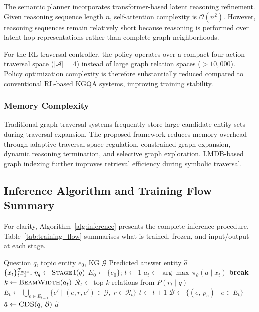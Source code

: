 \documentclass[10pt,conference]{IEEEtran}
\begin{document}
The semantic planner incorporates transformer-based latent reasoning refinement. Given reasoning sequence length $n$, self-attention complexity is $\mathcal{O}(n^2)$. However, reasoning sequences remain relatively short because reasoning is performed over latent hop representations rather than complete graph neighborhoods.

For the RL traversal controller, the policy operates over a compact four-action traversal space ($|\mathcal{A}|=4$) instead of large graph relation spaces ($>10,000$). Policy optimization complexity is therefore substantially reduced compared to conventional RL-based KGQA systems, improving training stability.

\subsubsection{Memory Complexity}

Traditional graph traversal systems frequently store large candidate entity sets during traversal expansion. The proposed framework reduces memory overhead through adaptive traversal-space regulation, constrained graph expansion, dynamic reasoning termination, and selective graph exploration. LMDB-based graph indexing further improves retrieval efficiency during symbolic traversal.


\subsection{Inference Algorithm and Training Flow Summary}

For clarity, Algorithm~\ref{alg:inference} presents the complete inference procedure. Table~\ref{tab:training_flow} summarises what is trained, frozen, and input/output at each stage.

\begin{algorithm}[t]
\caption{Framework Inference (Standard RL / STRL)}
\label{alg:inference}
\begin{algorithmic}[1]
\Require Question $q$, topic entity $e_0$, KG $\mathcal{G}$
\Ensure Predicted answer entity $\hat{a}$
\State $\{x_t\}_{t=1}^{T_{\max}},\, \eta_q \gets \textsc{Stage\,I}(q)$ 
\State $E_0 \gets \{e_0\}$;\; $t \gets 1$
    \State $a_t \gets \arg\max\,\pi_\theta(a \mid x_t)$
     \textbf{break} \EndIf
    \State $k \gets \textsc{BeamWidth}(a_t)$ 
    \State $\mathcal{R}_t \gets \text{top-}k$ relations from $P(r_t \mid q)$ 
    \State $E_t \gets \bigcup_{e \in E_{t-1}} \{e' \mid (e, r, e') \in \mathcal{G},\; r \in \mathcal{R}_t\}$
    \State $t \gets t + 1$
\EndWhile
\State $\mathcal{B} \gets \{(e,\, p_e) \mid e \in E_t\}$ 
\State $\hat{a} \gets \textsc{CDS}(q,\, \mathcal{B})$ 
\State \Return $\hat{a}$
\end{algorithmic}
\end{algorithm}
\end{document}
